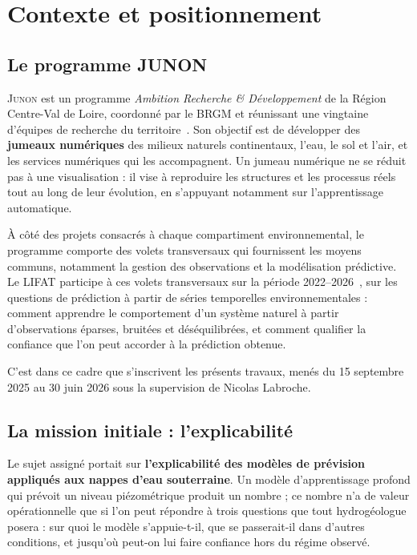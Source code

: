 \chapter{Contexte et positionnement}
\label{ch:contexte}


\section{Le programme JUNON}

\textsc{Junon} est un programme \emph{Ambition Recherche \& Développement} de la Région
Centre-Val de Loire, coordonné par le BRGM et réunissant une vingtaine d'équipes de recherche du
territoire~\cite{brgm_junon_programme,brgm_junon_lancement}. Son objectif est de développer des
\textbf{jumeaux numériques} des milieux naturels continentaux, l'eau, le sol et l'air, et les
services numériques qui les accompagnent. Un jumeau numérique ne se réduit pas à une
visualisation : il vise à reproduire les structures et les processus réels tout au long de leur
évolution, en s'appuyant notamment sur l'apprentissage automatique.

À côté des projets consacrés à chaque compartiment environnemental, le programme comporte des
volets transversaux qui fournissent les moyens communs, notamment la gestion des observations
et la modélisation prédictive. Le LIFAT participe à ces volets transversaux sur la période
2022--2026~\cite{lifat_junon}, sur les questions de prédiction à partir de séries temporelles
environnementales : comment apprendre le comportement d'un système naturel à partir
d'observations éparses, bruitées et déséquilibrées, et comment qualifier la confiance que l'on
peut accorder à la prédiction obtenue.

C'est dans ce cadre que s'inscrivent les présents travaux, menés du 15 septembre 2025 au 30 juin
2026 sous la supervision de Nicolas Labroche.

\section{La mission initiale : l'explicabilité}

Le sujet assigné portait sur \textbf{l'explicabilité des modèles de prévision appliqués aux
nappes d'eau souterraine}. Un modèle d'apprentissage
profond qui prévoit un niveau piézométrique produit un nombre ; ce nombre n'a de valeur
opérationnelle que si l'on peut répondre à trois questions que tout hydrogéologue posera :
sur quoi le modèle s'appuie-t-il, que se passerait-il dans d'autres conditions, et jusqu'où
peut-on lui faire confiance hors du régime observé.

